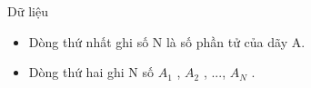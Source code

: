 Dữ liệu  
\begin{itemize}
	\item     Dòng thứ nhất ghi số N là số phần tử của dãy A.   
	\item     Dòng thứ hai ghi N số $A_{1}$    , $A_{2}$    , ...,  $A_{N}$    .   
\end{itemize}